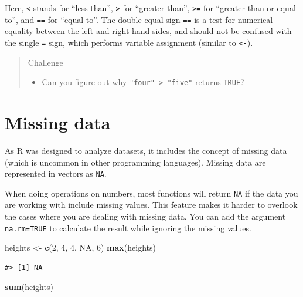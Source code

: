 \documentclass[
]{book}
\newenvironment{Shaded}{\begin{snugshade}}{\end{snugshade}}
\newcommand{\DecValTok}[1]{\textcolor[rgb]{0.00,0.00,0.81}{#1}}
\newcommand{\KeywordTok}[1]{\textcolor[rgb]{0.13,0.29,0.53}{\textbf{#1}}}
\newcommand{\NormalTok}[1]{#1}
\newcommand{\OtherTok}[1]{\textcolor[rgb]{0.56,0.35,0.01}{#1}}
\newcommand{\StringTok}[1]{\textcolor[rgb]{0.31,0.60,0.02}{#1}}
\providecommand{\tightlist}{%
  \setlength{\itemsep}{0pt}\setlength{\parskip}{0pt}}
\begin{document}
Here, \texttt{\textless{}} stands for ``less than'', \texttt{\textgreater{}} for ``greater than'', \texttt{\textgreater{}=} for ``greater than
or equal to'', and \texttt{==} for ``equal to''. The double equal sign \texttt{==} is a test for
numerical equality between the left and right hand sides, and should not be
confused with the single \texttt{=} sign, which performs variable assignment (similar
to \texttt{\textless{}-}).

\begin{quote}
Challenge

\begin{itemize}
\tightlist
\item
  Can you figure out why \texttt{"four"\ \textgreater{}\ "five"} returns \texttt{TRUE}?
\end{itemize}
\end{quote}

\hypertarget{missing-data}{%
\section{Missing data}\label{missing-data}}

As R was designed to analyze datasets, it includes the concept of missing data
(which is uncommon in other programming languages). Missing data are represented
in vectors as \texttt{NA}.

When doing operations on numbers, most functions will return \texttt{NA} if the data
you are working with include missing values. This feature
makes it harder to overlook the cases where you are dealing with missing data.
You can add the argument \texttt{na.rm=TRUE} to calculate the result while ignoring
the missing values.

\begin{Shaded}
\begin{Highlighting}[]
\NormalTok{heights <-}\StringTok{ }\KeywordTok{c}\NormalTok{(}\DecValTok{2}\NormalTok{, }\DecValTok{4}\NormalTok{, }\DecValTok{4}\NormalTok{, }\OtherTok{NA}\NormalTok{, }\DecValTok{6}\NormalTok{)}
\KeywordTok{max}\NormalTok{(heights)}
\end{Highlighting}
\end{Shaded}

\begin{verbatim}
#> [1] NA
\end{verbatim}

\begin{Shaded}
\begin{Highlighting}[]
\KeywordTok{sum}\NormalTok{(heights)}
\end{Highlighting}
\end{Shaded}
\end{document}
